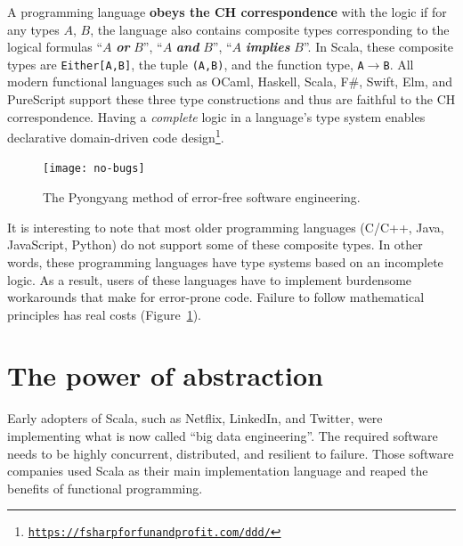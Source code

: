 A programming language \textbf{obeys the CH correspondence}
with the logic if for any types $A$, $B$, the language also contains
composite types corresponding to the logical formulas \textsf{``}$A$ \textbf{\emph{or}}
$B$\textsf{''}, \textsf{``}$A$ \textbf{\emph{and}} $B$\textsf{''}, \textsf{``}$A$ \textbf{\emph{implies}}
$B$\textsf{''}. In Scala, these composite types are \texttt{Either{[}A,B{]}},
the tuple \texttt{(A,B)}, and the function type, \texttt{A$\rightarrow$B}.
All modern functional languages such as OCaml, Haskell, Scala, F\#,
Swift, Elm, and PureScript support these three type constructions
and thus are faithful to the CH correspondence. Having a \emph{complete}
logic in a language\textsf{'}s type system enables declarative domain-driven
code design\footnote{\texttt{\href{https://fsharpforfunandprofit.com/ddd/}{https://fsharpforfunandprofit.com/ddd/}}}.

\begin{figure}%
\begin{centering}
\vspace{-0.5\baselineskip}
\texttt{[image: no-bugs]}\vspace{-0.5\baselineskip}
\par\end{centering}
\caption{The Pyongyang method of error-free software engineering.\label{fig:The-Pyongyang-method-of-error-free-programming}}
\vspace{-3\baselineskip}
\end{figure}%

It is interesting to note that most older programming languages (C/C++,
Java, JavaScript, Python) do not support some of these composite types.
In other words, these programming languages have type systems based
on an incomplete logic. As a result, users of these languages have
to implement burdensome workarounds that make for error-prone code.
Failure to follow mathematical principles has real costs (Figure~\ref{fig:The-Pyongyang-method-of-error-free-programming}).

\section{The power of abstraction}

Early adopters of Scala, such as Netflix, LinkedIn, and Twitter, were
implementing what is now called \textsf{``}big data engineering\textsf{''}. The required
software needs to be highly concurrent, distributed, and resilient
to failure. Those software companies used Scala as their main implementation
language and reaped the benefits of functional programming.

